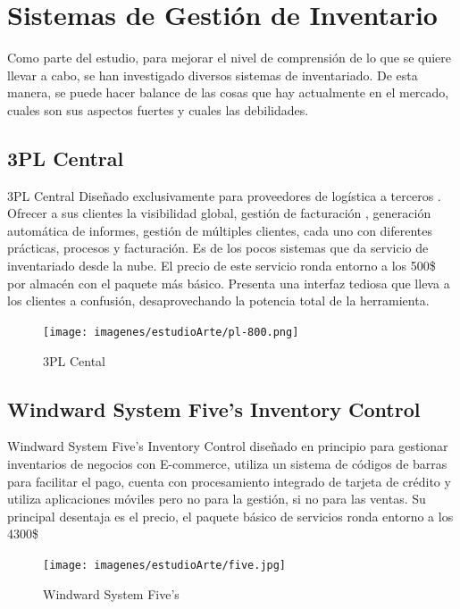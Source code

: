 \documentclass[a4paper,11pt]{book}
\begin{document}
\section{Sistemas de Gestión de Inventario}

Como parte del estudio, para mejorar el nivel de comprensión de lo que se quiere llevar a cabo, se han investigado diversos sistemas de inventariado. De esta manera, se puede hacer balance de las cosas que hay actualmente en el mercado, cuales son sus aspectos fuertes y cuales las debilidades. 


\subsection{3PL Central}

3PL Central\cite{3pl} Diseñado exclusivamente para proveedores de logística a terceros . Ofrecer a sus clientes la visibilidad global, gestión de facturación , generación automática de informes, gestión de múltiples clientes, cada uno con diferentes prácticas, procesos y facturación. Es de los pocos sistemas que da servicio de inventariado desde la nube. El precio de este servicio ronda entorno a los 500\$ por almacén con el paquete más básico. Presenta una interfaz tediosa que lleva a los clientes a confusión, desaprovechando la potencia total de la herramienta.

\begin{figure}[H]  
\centering 
\texttt{[image: imagenes/estudioArte/pl-800.png]}
\caption{ 3PL Cental  }  
\end{figure} 



\subsection{Windward System Five's Inventory Control}


Windward System Five's Inventory Control\cite{wws} diseñado en principio para gestionar inventarios de negocios con E-commerce, utiliza un sistema de códigos de barras para facilitar el pago, cuenta con procesamiento integrado de tarjeta de crédito y utiliza aplicaciones móviles pero no para la gestión, si no para las ventas. Su principal desentaja es el precio, el paquete básico de servicios ronda entorno a los 4300\$

\begin{figure}[H]  
\centering 
\texttt{[image: imagenes/estudioArte/five.jpg]}
\caption{Windward System Five's}  
\end{figure}
\end{document}
